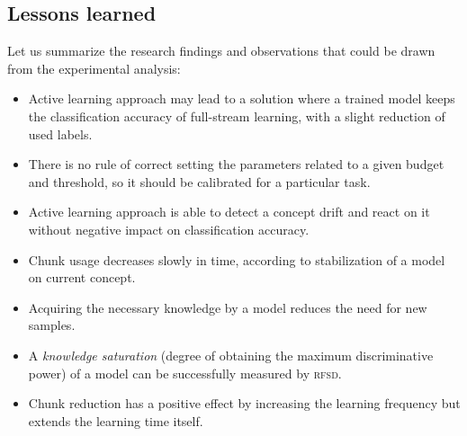\subsection{Lessons learned}
Let us summarize the research findings and observations that could be drawn from the experimental analysis:
\begin{itemize}
	\item Active learning approach may lead to a solution where a trained model keeps the classification accuracy of full-stream learning, with a slight reduction of used labels.
	\item There is no rule of correct setting the parameters related to a given budget and threshold, so it should be calibrated for a particular task.
	\item Active learning approach is able to detect a concept drift and react on it without negative impact on classification accuracy.
	\item Chunk usage decreases slowly in time, according to stabilization of a model on current concept.
	\item Acquiring the necessary knowledge by a model reduces the need for new samples.
    \item A \emph{knowledge saturation} (degree of obtaining the maximum discriminative power) of a model can be successfully measured by \textsc{rfsd}.
	\item Chunk reduction has a positive effect by increasing the learning frequency but extends the learning time itself.

\end{itemize}
